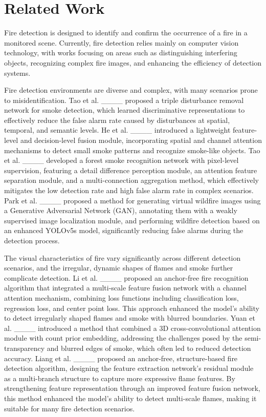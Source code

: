 \section{Related Work}
Fire detection is designed to identify and confirm the occurrence of a fire in a monitored scene. Currently, fire detection relies mainly on computer vision technology, with works focusing on areas such as distinguishing interfering objects, recognizing complex fire images, and enhancing the efficiency of detection systems.

Fire detection environments are diverse and complex, with many scenarios prone to misidentification. Tao et al. ____ proposed a triple disturbance removal network for smoke detection, which learned discriminative representations to effectively reduce the false alarm rate caused by disturbances at spatial, temporal, and semantic levels. He et al. ____ introduced a lightweight feature-level and decision-level fusion module, incorporating spatial and channel attention mechanisms to detect small smoke patterns and recognize smoke-like objects. Tao et al. ____ developed a forest smoke recognition network with pixel-level supervision, featuring a detail difference perception module, an attention feature separation module, and a multi-connection aggregation method, which effectively mitigates the low detection rate and high false alarm rate in complex scenarios. Park et al. ____ proposed a method for generating virtual wildfire images using a Generative Adversarial Network (GAN), annotating them with a weakly supervised image localization module, and performing wildfire detection based on an enhanced YOLOv5s model, significantly reducing false alarms during the detection process.

The visual characteristics of fire vary significantly across different detection scenarios, and the irregular, dynamic shapes of flames and smoke further complicate detection. Li et al. ____ proposed an anchor-free fire recognition algorithm that integrated a multi-scale feature fusion network with a channel attention mechanism, combining loss functions including classification loss, regression loss, and center point loss. This approach enhanced the model's ability to detect irregularly shaped flames and smoke with blurred boundaries. Yuan et al. ____ introduced a method that combined a 3D cross-convolutional attention module with count prior embedding, addressing the challenges posed by the semi-transparency and blurred edges of smoke, which often led to reduced detection accuracy. Liang et al. ____ proposed an anchor-free, structure-based fire detection algorithm, designing the feature extraction network's residual module as a multi-branch structure to capture more expressive flame features. By strengthening feature representation through an improved feature fusion network, this method enhanced the model's ability to detect multi-scale flames, making it suitable for many fire detection scenarios.

